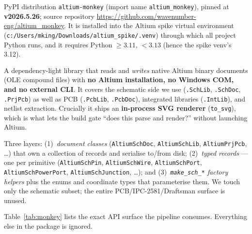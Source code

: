 \documentclass[11pt]{article}
\newcommand{\file}[1]{\texttt{#1}}
\newcommand{\mod}[1]{\texttt{#1}}
\begin{document}
\begin{description}[leftmargin=1.4em]
  \item[Where it comes from.] PyPI distribution \texttt{altium-monkey} (import
    name \mod{altium\_monkey}), pinned at \textbf{v2026.5.26}; source repository
    \url{https://github.com/wavenumber-eng/altium_monkey}. It is installed into
    the Altium spike virtual environment
    (\file{c:/Users/mking/Downloads/altium\_spike/.venv}) through which all
    project Python runs, and it requires Python $\geq 3.11,\,<3.13$ (hence the
    spike venv's 3.12).
  \item[What it is.] A dependency-light library that reads and \emph{writes}
    native Altium binary documents (OLE compound files) with \textbf{no Altium
    installation, no Windows COM, and no external CLI}. It covers the schematic
    side we use (\file{.SchLib}, \file{.SchDoc}, \file{.PrjPcb}) as well as PCB
    (\file{.PcbLib}, \file{.PcbDoc}), integrated libraries (\file{.IntLib}), and
    netlist extraction. Crucially it ships an \textbf{in-process SVG renderer}
    (\texttt{to\_svg}), which is what lets the build gate ``does this parse and
    render?'' without launching Altium.
  \item[What it includes.] Three layers: (1)~\emph{document classes}
    (\mod{AltiumSchDoc}, \mod{AltiumSchLib}, \mod{AltiumPrjPcb}, \dots) that own
    a collection of records and serialise to/from disk; (2)~\emph{typed records}
    --- one per primitive (\mod{AltiumSchPin}, \mod{AltiumSchWire},
    \mod{AltiumSchPort}, \mod{AltiumSchPowerPort}, \mod{AltiumSchJunction},
    \dots); and (3)~\emph{\texttt{make\_sch\_*} factory helpers} plus the enums
    and coordinate types that parameterise them. We touch only the schematic
    subset; the entire PCB/IPC-2581/Draftsman surface is unused.
\end{description}

\noindent Table~\ref{tab:monkey} lists the exact API surface the pipeline
consumes. Everything else in the package is ignored.
\end{document}
